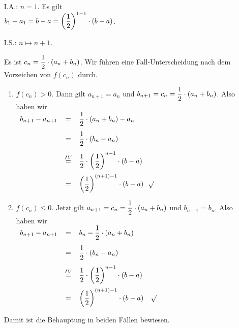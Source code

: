 \begin{enumerate}
\item[I.A.:] $n = 1$. Es gilt 
      \\[0.2cm]
      \hspace*{1.3cm}
      $\displaystyle b_1 - a_1 = b - a = \left(\frac{1}{2}\right)^{1-1} \cdot (b-a)$.
\item[I.S.:] $n \mapsto n+1$.  

      Es ist $\displaystyle c_n = \frac{1}{2} \cdot (a_n + b_n)$.   Wir f\"uhren eine 
      Fall-Unterscheidung nach dem Vorzeichen von $f(c_n)$ durch.
      \begin{enumerate}
      \item $f(c_n) > 0$.  Dann gilt $a_{n+1} = a_n$ und 
            $\displaystyle b_{n+1} = c_n = \frac{1}{2} \cdot(a_n + b_n)$.
            Also haben wir      
            \\[0.2cm]
            \hspace*{1.3cm}
            $
            \begin{array}[b]{lcl}
              b_{n+1} - a_{n+1} & = & \displaystyle\frac{1}{2}\cdot(a_n + b_n) - a_n \\[0.4cm]
                               & = & \displaystyle\frac{1}{2}\cdot(b_n - a_n)       \\[0.4cm]  
                  & \stackrel{IV}{=} & \displaystyle\frac{1}{2}\cdot\left(\frac{1}{2}\right)^{n-1}\cdot(b - a) \\[0.4cm]  
                                & = & \displaystyle\left(\frac{1}{2}\right)^{(n+1) - 1}\cdot(b - a) 
            \end{array}
            $$\surd$
      \item $f(c_n) \leq 0$.  Jetzt gilt $\displaystyle a_{n+1} = c_n = \frac{1}{2}\cdot(a_n + b_n)$ und 
            $b_{n+1} = b_n$.
            Also haben wir      
            \\[0.2cm]
            \hspace*{1.3cm}
            $
            \begin{array}[b]{lcl}
              b_{n+1} - a_{n+1} & = & \displaystyle b_n - \frac{1}{2}\cdot(a_n + b_n) \\[0.4cm]
                                & = & \displaystyle\frac{1}{2}\cdot(b_n - a_n)       \\[0.4cm]  
                  & \stackrel{IV}{=} & \displaystyle\frac{1}{2}\cdot\left(\frac{1}{2}\right)^{n-1}\cdot(b - a) \\[0.4cm]  
                                & = & \displaystyle\left(\frac{1}{2}\right)^{(n+1)-1}\cdot(b - a) 
            \end{array}
            $ $\surd$
      \end{enumerate}
      Damit ist die Behauptung in beiden F\"allen bewiesen.
\end{enumerate}
